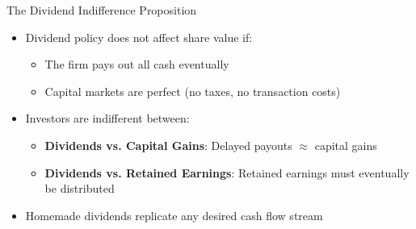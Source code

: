 \begin{frame}{The Dividend Indifference Proposition}

\begin{itemize}
    \item Dividend policy does not affect share value if:
    \begin{itemize}
        \item The firm pays out all cash eventually
        \item Capital markets are perfect (no taxes, no transaction costs)
    \end{itemize}
    
    \vspace{2mm}
    \item Investors are indifferent between:
    \begin{itemize}
        \item \textbf{Dividends vs. Capital Gains}: Delayed payouts $\approx$ capital gains
        \item \textbf{Dividends vs. Retained Earnings}: Retained earnings must eventually be distributed
    \end{itemize}
    
    \vspace{2mm}
    \item Homemade dividends replicate any desired cash flow stream
\end{itemize}

\end{frame}

